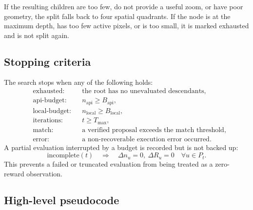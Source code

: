 If the resulting children are too few, do not provide a useful zoom, or have
poor geometry, the split falls back to four spatial quadrants. If the node is at
the maximum depth, has too few active pixels, or is too small, it is marked
exhausted and is not split again.

\subsection{Stopping criteria}

The search stops when any of the following holds:
\begin{equation}
  \begin{aligned}
    &\text{exhausted:} && \text{the root has no unevaluated descendants,} \\
    &\text{api-budget:} && n_{\mathrm{api}} \ge B_{\mathrm{api}}, \\
    &\text{local-budget:} && n_{\mathrm{local}} \ge B_{\mathrm{local}}, \\
    &\text{iterations:} && t \ge T_{\max}, \\
    &\text{match:} && \text{a verified proposal exceeds the match threshold,} \\
    &\text{error:} && \text{a non-recoverable execution error occurred.}
  \end{aligned}
  \label{eq:stop}
\end{equation}
A partial evaluation interrupted by a budget is recorded but is not backed up:
\begin{equation}
  \text{incomplete}(t)
  \quad\Longrightarrow\quad
  \Delta n_u = 0,\ \Delta R_u = 0
  \quad \forall u\in P_t.
\end{equation}
This prevents a failed or truncated evaluation from being treated as a
zero-reward observation.

\subsection{High-level pseudocode}

